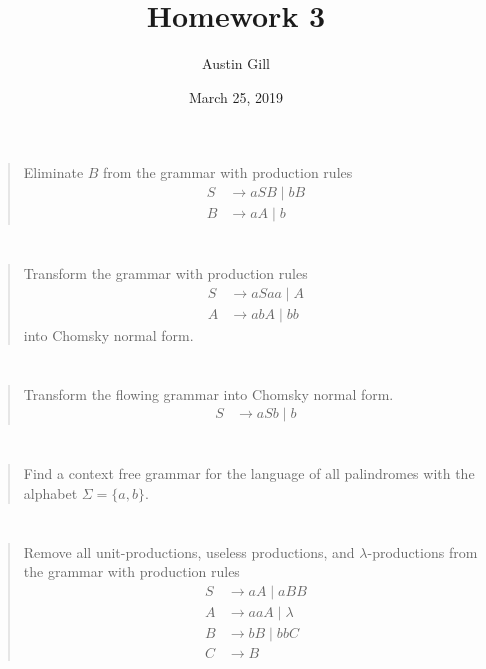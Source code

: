 \documentclass{article}
\title{Homework 3}
\author{Austin Gill}
\date{March 25, 2019}
\begin{document}
\maketitle

\section{}
\begin{quote}
    Eliminate $B$ from the grammar with production rules
    \begin{align*}
        S & \to aSB \mid bB \\
        B & \to aA \mid b
    \end{align*}
\end{quote}

\section{}
\begin{quote}
    Transform the grammar with production rules
    \begin{align*}
        S & \to aSaa \mid A \\
        A & \to abA \mid bb
    \end{align*}
    into Chomsky normal form.
\end{quote}

\section{}
\begin{quote}
    Transform the flowing grammar into Chomsky normal form.
    \begin{align*}
        S & \to aSb \mid b
    \end{align*}
\end{quote}

\section{}
\begin{quote}
    Find a context free grammar for the language of all palindromes with the alphabet $\Sigma = \{a, b\}$.
\end{quote}

\section{}
\begin{quote}
    Remove all unit-productions, useless productions, and $\lambda$-productions from the grammar with production rules
    \begin{align*}
        S & \to aA \mid aBB      \\
        A & \to aaA \mid \lambda \\
        B & \to bB \mid bbC      \\
        C & \to B
    \end{align*}
\end{quote}
\end{document}
